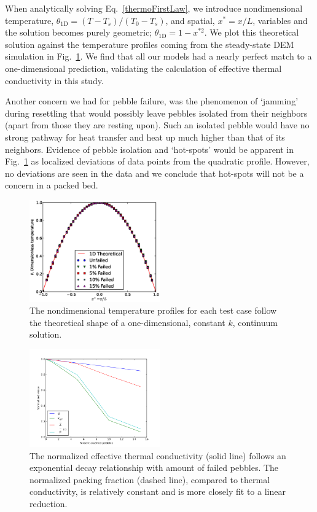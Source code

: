 When analytically solving Eq.~\ref{thermoFirstLaw}, we introduce nondimensional temperature, $\theta_\text{1D} = (T -T_s)/(T_0-T_s)$, and spatial, $x^* = x/L$, variables and the solution becomes purely geometric; $\theta_\text{1D} = 1-x^{*2}$. We plot this theoretical solution against the temperature profiles coming from the steady-state DEM simulation in Fig.~\ref{fig:tempProfile}. We find that all our models had a nearly perfect match to a one-dimensional prediction, validating the calculation of effective thermal conductivity in this study. 

Another concern we had for pebble failure, was the phenomenon of `jamming' during resettling that would possibly leave pebbles isolated from their neighbors (apart from those they are resting upon). Such an isolated pebble would have no strong pathway for heat transfer and heat up much higher than that of its neighbors. Evidence of pebble isolation and `hot-spots' would be apparent in Fig.~\ref{fig:tempProfile} as localized deviations of data points from the quadratic profile. However, no deviations are seen in the data and we conclude that hot-spots will not be a concern in a packed bed.

\begin{figure}[t]
	\centering
	\includegraphics[width=0.5\textwidth]{chapters/figures/tempProfiles}
	\caption{The nondimensional temperature profiles for each test case follow the theoretical shape of a one-dimensional, constant $k$, continuum solution.}
\label{fig:tempProfile}
\end{figure}



\begin{figure}[t]
	\centering
	\includegraphics[width=0.5\textwidth]{chapters/figures/kEff_packingFraction}
	\caption{The normalized effective thermal conductivity (solid line) follows an exponential decay relationship with amount of failed pebbles. The normalized packing fraction (dashed line), compared to thermal conductivity, is relatively constant and is more closely fit to a linear reduction.}
\label{fig:packingFraction}
\end{figure}

